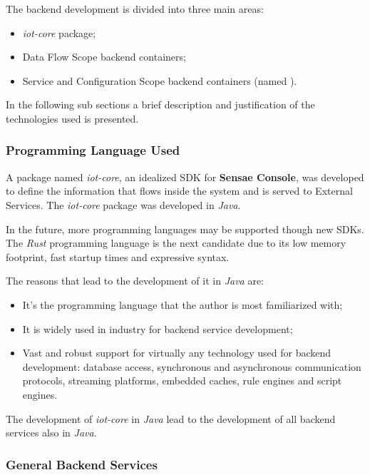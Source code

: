 The backend development is divided into three main areas:

\begin{itemize}
    \item \textit{iot-core} package;
    \item Data Flow Scope backend containers;
    \item Service and Configuration Scope backend containers (named ).
\end{itemize}

In the following sub sections a brief description and justification of the technologies used is presented.

\subsubsection{Programming Language Used}
\label{subsubsec:implementation:decisions:backend:prog}

A package named \textit{iot-core}, an idealized \gls{SDK} for \textbf{Sensae Console}, was developed to define the information that flows inside the system and is served to External Services.
The \textit{iot-core} package was developed in \textit{Java}.

In the future, more programming languages may be supported though new \gls{SDK}s. The \textit{Rust} programming language is the next candidate due to its low memory footprint, fast startup times and expressive syntax.

The reasons that lead to the development of it in \textit{Java} are:

\begin{itemize}
    \item It's the programming language that the author is most familiarized with;
    \item It is widely used in industry for backend service development;
    \item Vast and robust support for virtually any technology used for backend development: database access, synchronous and asynchronous communication protocols, streaming platforms, embedded caches, rule engines and script engines.
\end{itemize}

The development of \textit{iot-core} in \textit{Java} lead to the development of all backend services also in \textit{Java}.

\subsubsection{General Backend Services}
\label{subsubsec:implementation:decisions:backend:geral}


